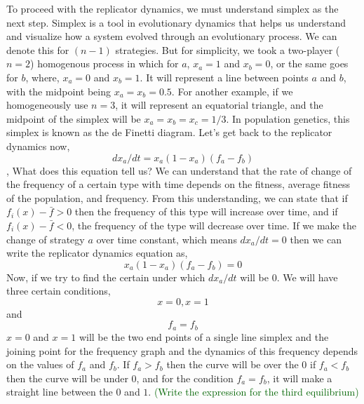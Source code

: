 \documentclass{article}
\newcommand{\cha}[1]{\textcolor{darkgreen}{(#1)}}
\begin{document}
To proceed with the replicator dynamics, we must understand simplex as the next step.
Simplex is a tool in evolutionary dynamics that helps us understand and visualize how a system evolved through an evolutionary process. We can denote this for $(n-1)$ strategies. But for simplicity, we took a two-player ($n=2$) homogenous process in which for $a$, $x_a=1$ and $x_b=0$, or the same goes for $b$, where, $x_a=0$ and $x_b=1$.
It will represent a line between points $a$ and $b$, with the midpoint being $x_a=x_b=0.5$. 
For another example, if we homogeneously use $ n=3$, it will represent an equatorial triangle, and the midpoint of the simplex will be $x_a=x_b=x_c=1/3$.
In population genetics, this simplex is known as the de Finetti diagram.
Let's get back to the replicator dynamics now,
\[dx_a/dt=x_a(1-x_a)(f_a-f_b)\],
What does this equation tell us? 
We can understand that the rate of change of the frequency of a certain type with time depends on the fitness, average fitness of the population, and frequency. From this understanding, we can state that if $f_i(x)-\bar{f}>0$ then the frequency of this type will increase over time, and if $f_i(x)-\bar{f}<0$, the frequency of the type will decrease over time.
If we make the change of strategy $a$ over time constant, which means $dx_a/dt=0$ then we can write the replicator dynamics equation as,
\[x_a(1-x_a)(f_a-f_b)=0\]
Now, if we try to find the certain under which $dx_a/dt$ will be $0$.
We will have three certain conditions,
\[x=0,x=1\] and \[f_a=f_b\]
$x=0$ and $x=1$ will be the two end points of a single line simplex and the joining point for the frequency graph and the dynamics of this frequency depends on the values of $f_a$ and $f_b$. If $f_a>f_b$ then the curve will be over the $0$ if $f_a<f_b$ then the curve will be under $0$, and for the condition $f_a=f_b$, it will make a straight line between the $0$ and $1$. 
\cha{Write the expression for the third equilibrium}
\end{document}
